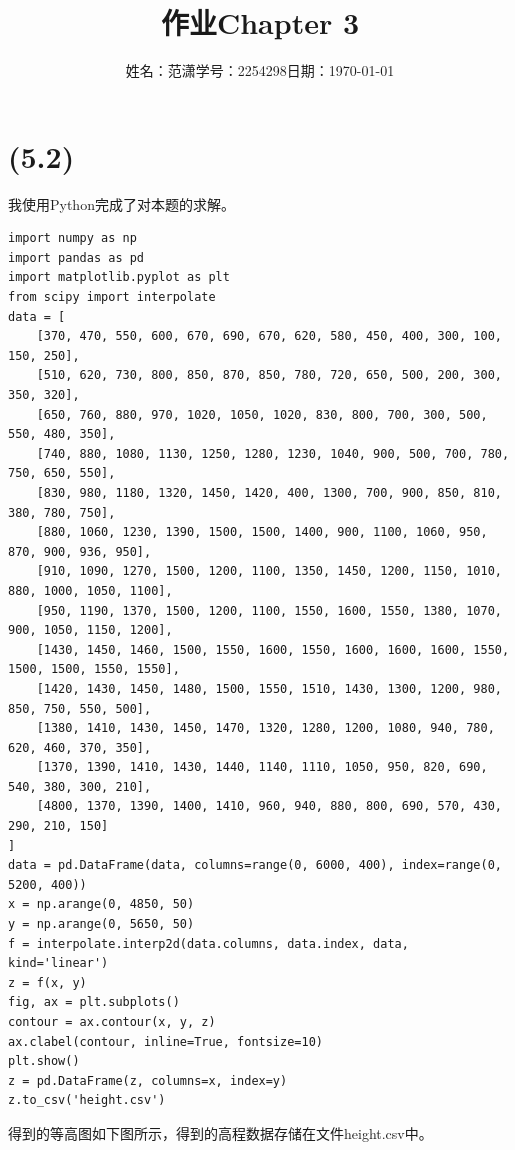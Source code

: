 \documentclass[a4paper]{article}
\title{作业{\hspace{1ex}}Chapter 3}
\author{姓名：范潇{\quad}学号：2254298{\quad}日期：\today}
\date{}
\begin{document}
\maketitle
\section{(5.2)}
我使用Python完成了对本题的求解。

\begin{lstlisting}[emph={[3]columns,index,kind,inline,fontsize},emphstyle={[3]\color{vscode_parametercolor}},emph={[4]SearchProblem,Callable,Node,Reached,Any,Tuple,List,FoodSearchProblem},emphstyle={[4]\color{vscode_classcolor}}]
import numpy as np
import pandas as pd
import matplotlib.pyplot as plt
from scipy import interpolate
data = [
    [370, 470, 550, 600, 670, 690, 670, 620, 580, 450, 400, 300, 100, 150, 250],
    [510, 620, 730, 800, 850, 870, 850, 780, 720, 650, 500, 200, 300, 350, 320],
    [650, 760, 880, 970, 1020, 1050, 1020, 830, 800, 700, 300, 500, 550, 480, 350],
    [740, 880, 1080, 1130, 1250, 1280, 1230, 1040, 900, 500, 700, 780, 750, 650, 550],
    [830, 980, 1180, 1320, 1450, 1420, 400, 1300, 700, 900, 850, 810, 380, 780, 750],
    [880, 1060, 1230, 1390, 1500, 1500, 1400, 900, 1100, 1060, 950, 870, 900, 936, 950],
    [910, 1090, 1270, 1500, 1200, 1100, 1350, 1450, 1200, 1150, 1010, 880, 1000, 1050, 1100],
    [950, 1190, 1370, 1500, 1200, 1100, 1550, 1600, 1550, 1380, 1070, 900, 1050, 1150, 1200],
    [1430, 1450, 1460, 1500, 1550, 1600, 1550, 1600, 1600, 1600, 1550, 1500, 1500, 1550, 1550],
    [1420, 1430, 1450, 1480, 1500, 1550, 1510, 1430, 1300, 1200, 980, 850, 750, 550, 500],
    [1380, 1410, 1430, 1450, 1470, 1320, 1280, 1200, 1080, 940, 780, 620, 460, 370, 350],
    [1370, 1390, 1410, 1430, 1440, 1140, 1110, 1050, 950, 820, 690, 540, 380, 300, 210],
    [4800, 1370, 1390, 1400, 1410, 960, 940, 880, 800, 690, 570, 430, 290, 210, 150]
]
data = pd.DataFrame(data, columns=range(0, 6000, 400), index=range(0, 5200, 400))
x = np.arange(0, 4850, 50)
y = np.arange(0, 5650, 50)
f = interpolate.interp2d(data.columns, data.index, data, kind='linear')
z = f(x, y)
fig, ax = plt.subplots()
contour = ax.contour(x, y, z)
ax.clabel(contour, inline=True, fontsize=10)
plt.show()
z = pd.DataFrame(z, columns=x, index=y)
z.to_csv('height.csv')
\end{lstlisting}
得到的等高图如下图所示，得到的高程数据存储在文件height.csv中。
\end{document}
